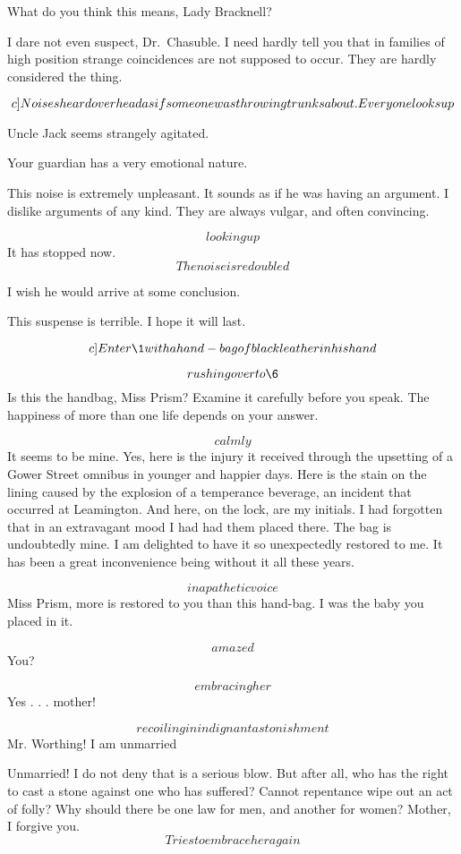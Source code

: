 \documentclass{book}
\begin{document}
\7  What do you think this means, Lady Bracknell?

\3  I dare not even suspect, Dr.~Chasuble.  I need
hardly tell you that in families of high position strange
coincidences are not supposed to occur.  They are hardly considered
the thing.

\[c]Noises heard overhead as if some one was throwing trunks about.\\
Every one looks up\]

\5  Uncle Jack seems strangely agitated.

\7  Your guardian has a very emotional nature.

\3  This noise is extremely unpleasant.  It sounds as
if he was having an argument.  I dislike arguments of any kind.
They are always vulgar, and often convincing.

\7  \[looking up\]  It has stopped now.  \[The noise is
redoubled\]

\3  I wish he would arrive at some conclusion.

\4  This suspense is terrible.  I hope it will last.

\[c]Enter \1 with a hand-bag of black leather in his hand\]

\1  \[rushing over to \6\]  Is this the handbag, Miss
Prism?  Examine it carefully before you speak.  The happiness of
more than one life depends on your answer.

\6  \[calmly\]  It seems to be mine.  Yes, here is the
injury it received through the upsetting of a Gower Street omnibus
in younger and happier days.  Here is the stain on the lining
caused by the explosion of a temperance beverage, an incident that
occurred at Leamington.  And here, on the lock, are my initials.  I
had forgotten that in an extravagant mood I had had them placed
there.  The bag is undoubtedly mine.  I am delighted to have it so
unexpectedly restored to me.  It has been a great inconvenience
being without it all these years.

\1  \[in a pathetic voice\]  Miss Prism, more is restored to you
than this hand-bag.  I was the baby you placed in it.

\6  \[amazed\]  You?

\1  \[embracing her\]  Yes . . . mother!

\6  \[recoiling in indignant astonishment\]  Mr. Worthing!
I am unmarried

\1  Unmarried!  I do not deny that is a serious blow.  But after
all, who has the right to cast a stone against one who has
suffered?  Cannot repentance wipe out an act of folly?  Why should
there be one law for men, and another for women?  Mother, I forgive
you.  \[Tries to embrace her again\]
\end{document}

